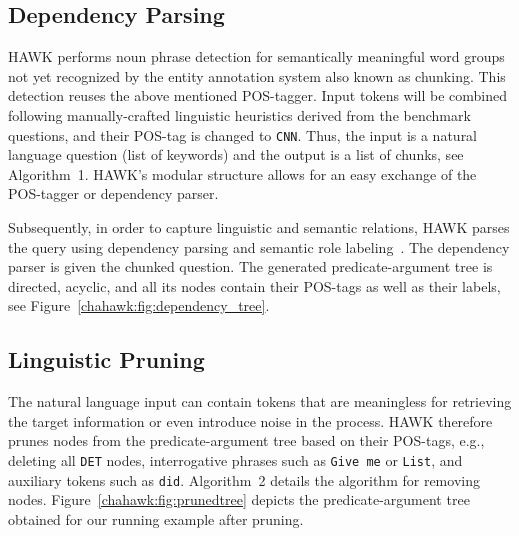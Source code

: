 \subsection{Dependency Parsing}
HAWK performs noun phrase detection for semantically meaningful word groups not yet recognized by the entity annotation system also known as chunking.
This detection reuses the above mentioned POS-tagger. %
Input tokens will be combined following manually-crafted linguistic heuristics derived from the benchmark questions, and their POS-tag is changed to \texttt{CNN}.
Thus, the input is a natural language question (list of keywords) and the output is a list of chunks, see Algorithm~1.
HAWK's modular structure allows for an easy exchange of the POS-tagger or dependency parser.



Subsequently, in order to capture linguistic and semantic relations, HAWK parses the query using dependency parsing and semantic role labeling~\cite{choi2011getting}.
The dependency parser is given the chunked question. 
The generated pre\-dicate-argument tree is directed, acyclic, and all its nodes contain their POS-tags as well as their labels, see Figure~\ref{chahawk:fig:dependency_tree}.


\subsection{Linguistic Pruning}

The natural language input can contain tokens that are meaningless for retrieving the target information or even introduce noise in the process.
HAWK therefore prunes nodes from the predicate-argument tree based on their POS-tags, e.g., deleting all \texttt{DET} nodes, interrogative phrases such as \texttt{Give me} or \texttt{List}, and auxiliary tokens such as \texttt{did}.
Algorithm~2 details the algorithm for removing nodes.
Figure~\ref{chahawk:fig:prunedtree} depicts the predicate-argument tree obtained for our running example after pruning.%



